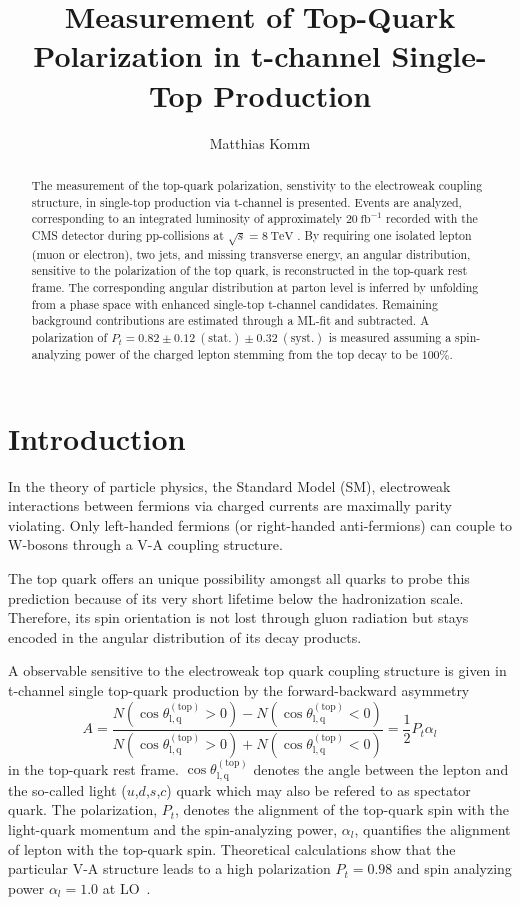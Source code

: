 \documentclass[a4paper]{jpconf}
\newcommand{\unit}[1]{\ensuremath{\mathrm{~#1}}}
\newcommand{\particle}[1]{\ensuremath{#1}}
\newcommand{\costheta}[0]{\cos\theta_{\mathrm{l,q}}^{\mathrm{(top)}}}
\begin{document}
\title{Measurement of Top-Quark Polarization in t-channel Single-Top Production}

\author{Matthias Komm}

\address{Centre for Cosmology, Particle Physics and Phenomenology, Universit\'e catholique de Louvain, 1348 Louvain-la-Neuve, Belgium}


\begin{abstract}
The measurement of the top-quark polarization, senstivity to the electroweak coupling structure, in single-top production via t-channel is presented. Events are analyzed, corresponding to an integrated luminosity of approximately $20\unit{fb^{-1}}$ recorded with the CMS detector during pp-collisions at $\sqrt{s}=8\unit{TeV}$ . By requiring one isolated lepton (muon or electron), two jets, and missing transverse energy, an angular distribution, sensitive to the  polarization of the top quark, is reconstructed in the top-quark rest frame. The corresponding angular distribution at parton level is inferred by unfolding from a phase space with enhanced single-top t-channel candidates. Remaining background contributions are estimated through a ML-fit and subtracted. A polarization of $P_{t}=0.82\pm0.12\mathrm{~(stat.)}\pm0.32\mathrm{~(syst.)}$ is measured assuming a spin-analyzing power of the charged lepton stemming from the top decay to be $100\%$.
\end{abstract}

\section{Introduction}
In the theory of particle physics, the Standard Model (SM), electroweak interactions between fermions via charged currents are maximally parity violating. Only left-handed fermions (or right-handed anti-fermions) can couple to W-bosons through a V-A coupling structure.


The top quark offers an unique possibility amongst all quarks to probe this prediction because of its very short lifetime below the hadronization scale. Therefore, its spin orientation is not lost through gluon radiation but stays encoded in the angular distribution of its decay products.


A observable sensitive to the electroweak top quark coupling structure is given in t-channel single top-quark production by the forward-backward asymmetry
\begin{equation}
A=\frac{N(\costheta>0)-N(\costheta<0)}{N(\costheta>0)+N(\costheta<0)}=\frac{1}{2}P_{t}\alpha_{l}
\end{equation}
in the top-quark rest frame. $\costheta$ denotes the angle between the lepton and the so-called light ($\particle{u}$,$\particle{d}$,$\particle{s}$,$\particle{c}$) quark which may also be refered to as spectator quark. The polarization, $P_{t}$, denotes the alignment of the top-quark spin with the light-quark momentum and the spin-analyzing power, $\alpha_{l}$, quantifies the alignment of lepton with the top-quark spin. Theoretical calculations show that the particular V-A structure leads to a high polarization $P_{t}=0.98$ and spin analyzing power $\alpha_{l}=1.0$ at LO~\cite{bernreuther}.
\end{document}
